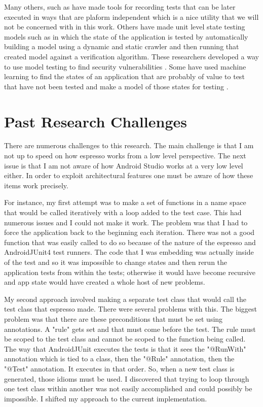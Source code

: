 Many others, such as \cite{7927971} have made tools for recording tests that can be later executed in ways that are plaform independent which is a nice utility that we will not be concerned with in this work.  Others have made unit level state testing models such as \cite{MilaniFard:2014:LET:2642937.2642991} in which the state of the application is tested by automatically building a model using a dynamic and static crawler and then running that created model against a verification algorithm.  These researchers developed a way to use model testing to find security vulnerabilities \cite{7911333}.  Some have used machine learning to find the states of an application that are probably of value to test that have not been tested and make a model of those states for testing \cite{Choi:2013:GGT:2544173.2509552}.


\section{Past Research Challenges}
There are numerous challenges to this research.  The main challenge is that I am not up to speed on how espresso works from a low level perspective.  The next issue is that I am not aware of how Android Studio works at a very low level either.  In order to exploit architectural features one must be aware of how these items work precisely.  

For instance, my first attempt was to make a set of functions in a name space that would be called iteratively with a loop added to the test case.  This had numerous issues and I could not make it work.  The problem was that I had to force the application back to the beginning each iteration.  There was not a good function that was easily called to do so because of the nature of the espresso and AndroidJUnit4 test runners.  The code that I was embedding was actually inside of the test and so it was impossible to change states and then rerun the application tests from within the tests; otherwise it would have become recursive and app state would have created a whole host of new problems.  

My second approach involved making a separate test class that would call the test class that espresso made.  There were several problems with this.  The biggest problem was that there are these preconditions that must be set using annotations.  A "rule" gets set and that must come before the test.  The rule must be scoped to the test class and cannot be scoped to the function being called.  The way that AndroidJUnit executes the tests is that it sees the "@RunWith" annotation which is tied to a class, then the "@Rule" annotation, then the "@Test" annotation.  It executes in that order.  So, when a new test class is generated, those idioms must be used. I discovered that trying to loop through one test class within another was not easily accomplished and could possibly be impossible.  I shifted my approach to the current implementation.


